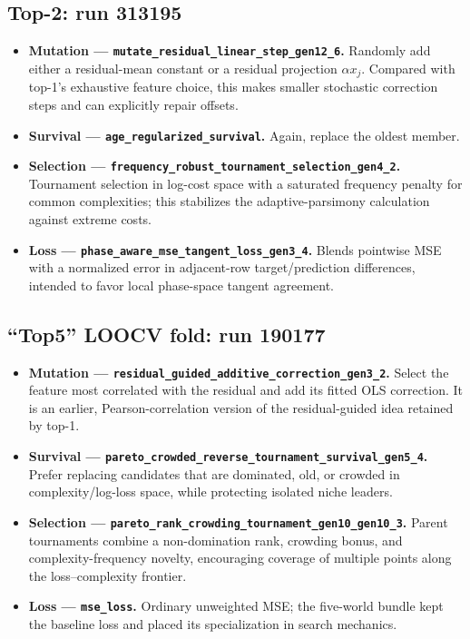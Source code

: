 \documentclass[10pt]{article}
\newcommand{\code}[1]{\nolinkurl{#1}}
\begin{document}
\subsection*{Top-2: run 313195}
\begin{itemize}
  \item \textbf{Mutation --- \code{mutate_residual_linear_step_gen12_6}.}
  Randomly add either a residual-mean constant or a residual projection $\alpha x_j$. Compared
  with top-1's exhaustive feature choice, this makes smaller stochastic correction steps and can
  explicitly repair offsets.
  \item \textbf{Survival --- \code{age_regularized_survival}.} Again, replace the oldest member.
  \item \textbf{Selection --- \code{frequency_robust_tournament_selection_gen4_2}.}
  Tournament selection in log-cost space with a saturated frequency penalty for common
  complexities; this stabilizes the adaptive-parsimony calculation against extreme costs.
  \item \textbf{Loss --- \code{phase_aware_mse_tangent_loss_gen3_4}.}
  Blends pointwise MSE with a normalized error in adjacent-row target/prediction differences,
  intended to favor local phase-space tangent agreement.
\end{itemize}

\subsection*{``Top5'' LOOCV fold: run 190177}
\begin{itemize}
  \item \textbf{Mutation --- \code{residual_guided_additive_correction_gen3_2}.}
  Select the feature most correlated with the residual and add its fitted OLS correction. It is
  an earlier, Pearson-correlation version of the residual-guided idea retained by top-1.
  \item \textbf{Survival --- \code{pareto_crowded_reverse_tournament_survival_gen5_4}.}
  Prefer replacing candidates that are dominated, old, or crowded in complexity/log-loss space,
  while protecting isolated niche leaders.
  \item \textbf{Selection --- \code{pareto_rank_crowding_tournament_gen10_gen10_3}.}
  Parent tournaments combine a non-domination rank, crowding bonus, and complexity-frequency
  novelty, encouraging coverage of multiple points along the loss--complexity frontier.
  \item \textbf{Loss --- \code{mse_loss}.} Ordinary unweighted MSE; the five-world bundle kept
  the baseline loss and placed its specialization in search mechanics.
\end{itemize}
\end{document}
